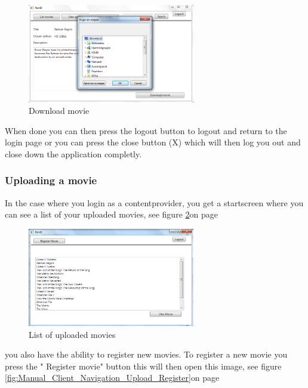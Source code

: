 \begin{figure}[h!]  
\caption{Download movie}
\label{fig:Manual_Client_Navigation_Rent_Download}
  \centering
\includegraphics[width=0.65\textwidth]{Parts/Images/Manual/Downloadmovie}
\end{figure}
 
 When done you can then press the logout button to logout and return to the login page or you can press the close button (X) which will then log you out and close down the application completly.

\subsubsection{Uploading a movie}
\label{Manual_Client_Navigation_Upload}
In the case where you login as a contentprovider, you get a startscreen where you can see a list of your uploaded movies, see figure
\ref{fig:Manual_Client_Navigation_Upload_List}on page \pageref{fig:Manual_Client_Navigation_Upload_List}


\begin{figure}[h!]  
\caption{List of uploaded movies}
\label{fig:Manual_Client_Navigation_Upload_List}
  \centering
\includegraphics[width=0.65\textwidth]{Parts/Images/Manual/CPmovielist}
\end{figure}
 
 you also have the ability to register new movies. To register a new movie you press the " Register movie" button this will then open this image, see figure \ref{fig:Manual_Client_Navigation_Upload_Register}on page \pageref{fig:Manual_Client_Navigation_Upload_Register}


